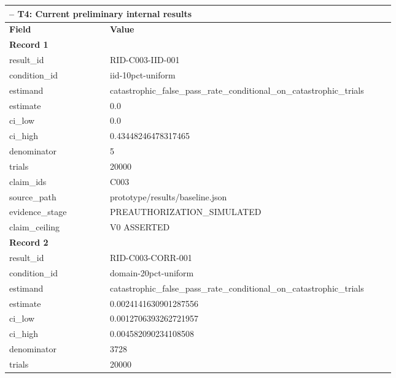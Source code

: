 \begingroup
\setlength{\tabcolsep}{2pt}
\small\sloppy
\begin{longtable}{|p{0.24\linewidth}|p{0.68\linewidth}|}
\hline
\multicolumn{2}{|l|}{\KeystoneDraftTableNotice{} -- T4: Current preliminary internal results} \\ \hline
\textbf{Field} & \textbf{Value} \\ \hline
\multicolumn{2}{|l|}{\textbf{Record 1}} \\ \hline
result\_\allowbreak{}id & RID-C003-IID-001 \\ \hline
condition\_\allowbreak{}id & iid-10pct-uniform \\ \hline
estimand & catastrophic\_\allowbreak{}false\_\allowbreak{}pass\_\allowbreak{}rate\_\allowbreak{}conditional\_\allowbreak{}on\_\allowbreak{}catastrophic\_\allowbreak{}trials \\ \hline
estimate & 0.0 \\ \hline
ci\_\allowbreak{}low & 0.0 \\ \hline
ci\_\allowbreak{}high & 0.43448246478317465 \\ \hline
denominator & 5 \\ \hline
trials & 20000 \\ \hline
claim\_\allowbreak{}ids & C003 \\ \hline
source\_\allowbreak{}path & prototype/results/baseline.json \\ \hline
evidence\_\allowbreak{}stage & PREAUTHORIZATION\_\allowbreak{}SIMULATED \\ \hline
claim\_\allowbreak{}ceiling & V0 ASSERTED \\ \hline
\multicolumn{2}{|l|}{\textbf{Record 2}} \\ \hline
result\_\allowbreak{}id & RID-C003-CORR-001 \\ \hline
condition\_\allowbreak{}id & domain-20pct-uniform \\ \hline
estimand & catastrophic\_\allowbreak{}false\_\allowbreak{}pass\_\allowbreak{}rate\_\allowbreak{}conditional\_\allowbreak{}on\_\allowbreak{}catastrophic\_\allowbreak{}trials \\ \hline
estimate & 0.0024141630901287556 \\ \hline
ci\_\allowbreak{}low & 0.0012706393262721957 \\ \hline
ci\_\allowbreak{}high & 0.004582090234108508 \\ \hline
denominator & 3728 \\ \hline
trials & 20000 \\ \hline

\end{longtable}
